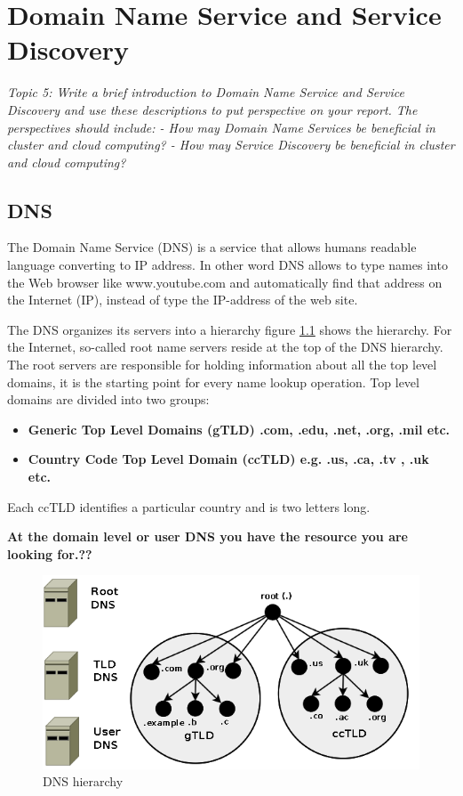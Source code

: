 \chapter{Domain Name Service and Service Discovery}\label{ch:dns}
\textit{Topic 5: Write a brief introduction to Domain Name Service and Service Discovery and use these descriptions to put perspective on your report. The perspectives should include:
- How may Domain Name Services be beneficial in cluster and cloud computing?
- How may Service Discovery be beneficial in cluster and cloud computing?}
\section{DNS}
The Domain Name Service (DNS) is a service that allows humans readable language converting to IP address. In other word DNS allows to type names into the Web browser like www.youtube.com and automatically find that address on the Internet (IP), instead of type the IP-address of the web site.

The DNS organizes its servers into a hierarchy figure \ref{fig:DNShierarchy} shows the hierarchy. For the Internet, so-called root name servers reside at the top of the DNS hierarchy. The root servers are responsible for holding information about all the top level domains, it is the starting point for every name lookup operation. Top level domains are divided into two groups:

\begin{itemize}
\item \textbf{Generic Top Level Domains (gTLD) .com, .edu, .net, .org, .mil etc.}
\item \textbf{ Country Code Top Level Domain (ccTLD) e.g. .us, .ca, .tv , .uk etc.}
\end{itemize}
Each ccTLD identifies a particular country and is two letters long.   

\textbf{At the domain level or user DNS you have the resource you are looking for.??
}

\begin{figure}[bth]
\includegraphics[width=1\linewidth]{gfx/DNShierarchy}
\caption[routingtable]{DNS hierarchy} \label{fig:DNShierarchy}
\end{figure}

